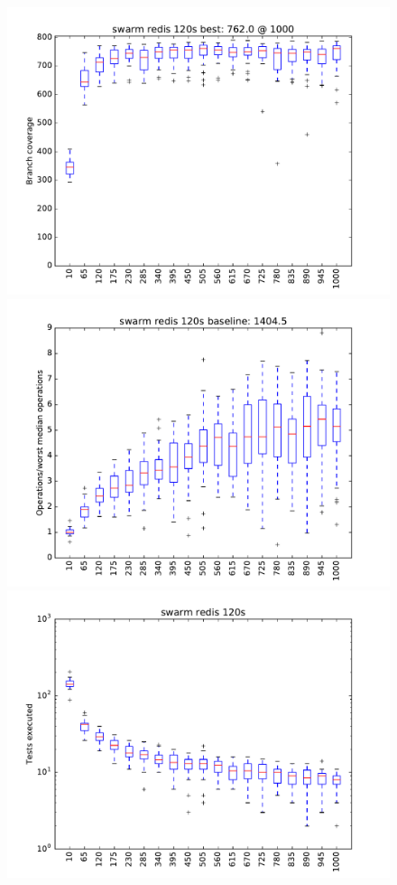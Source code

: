 \begin{figure}
\includegraphics[width=\columnwidth]{graphs/redisswarm120}
\includegraphics[width=\columnwidth]{graphs/opsredisswarm120}
\includegraphics[width=\columnwidth]{graphs/execredisswarm120}
\end{figure}

